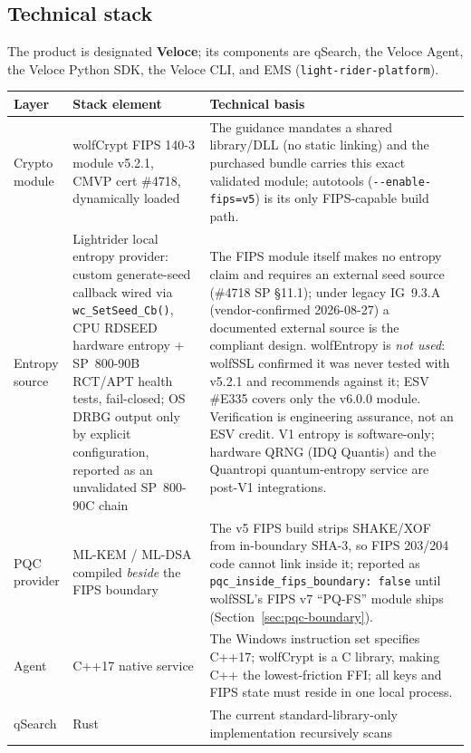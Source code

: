 \documentclass[10pt]{article}
\newcommand{\code}[1]{\texttt{\small #1}}
\begin{document}
\subsection*{Technical stack}

The product is designated \textbf{Veloce}; its components are qSearch, the Veloce Agent,
the Veloce Python SDK, the Veloce CLI, and EMS (\code{light-rider-platform}).

\begin{small}
\begin{tabularx}{\textwidth}{@{}l>{\raggedright\arraybackslash}p{}L@{}}
\toprule
\textbf{Layer} & \textbf{Stack element} & \textbf{Technical basis} \\
\midrule
Crypto module & wolfCrypt FIPS 140-3 module v5.2.1, CMVP cert \#4718, dynamically
  loaded & The guidance mandates a shared library/DLL (no static linking) and the
  purchased bundle carries this exact validated module; autotools
  (\code{-{}-enable-fips=v5}) is its only FIPS-capable build path. \\
Entropy source & Lightrider local entropy provider: custom generate-seed callback wired
  via \code{wc\_SetSeed\_Cb()}, CPU RDSEED hardware entropy + SP~800-90B RCT/APT health
  tests, fail-closed; OS DRBG output only by explicit configuration, reported as an
  unvalidated SP~800-90C chain & The FIPS module itself makes no entropy claim and requires an external
  seed source (\#4718 SP \S11.1); under legacy IG~9.3.A (vendor-confirmed 2026-08-27) a
  documented external source is the compliant design. wolfEntropy is \emph{not used}:
  wolfSSL confirmed it was never tested with v5.2.1 and recommends against it; ESV
  \#E335 covers only the v6.0.0 module. Verification is engineering assurance, not an
  ESV credit. V1 entropy is software-only; hardware QRNG (IDQ Quantis) and the Quantropi
  quantum-entropy service are post-V1 integrations. \\
PQC provider & ML-KEM / ML-DSA compiled \emph{beside} the FIPS boundary & The v5 FIPS
  build strips SHAKE/XOF from in-boundary SHA-3, so FIPS 203/204 code cannot link inside
  it; reported as \code{pqc\_inside\_fips\_boundary:\ false} until wolfSSL's FIPS v7
  ``PQ-FS'' module ships (Section~\ref{sec:pqc-boundary}). \\
Agent & C++17 native service & The Windows instruction set specifies C++17; wolfCrypt is
  a C library, making C++ the lowest-friction FFI; all keys and FIPS state must reside in
  one local process. \\
qSearch & Rust & The current standard-library-only implementation recursively scans

\end{tabularx}
\end{small}
\end{document}
